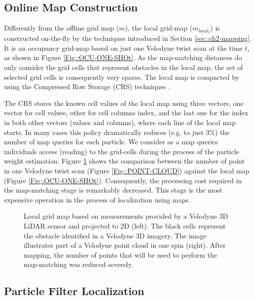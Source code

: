 \subsection {Online Map Construction}
Differently from the offline grid map ($m$), the local grid-map ($m_{local_{t}}$) is constructed on-the-fly by the techniques introduced in Section  \ref{sec::ch2-mapping}. It is an occupancy grid-map based on just one Velodyne twist scan at the time $t$, as shown in Figure \ref{Fig::OCU-ONE-SHOt}. As the map-matching distances do only consider the grid cells that represent obstacles in the local map, the set of selected grid cells is consequently very sparse. The local map is compacted by using the Compressed Row Storage (CRS) techniques \cite{bai2000templates}. 

The CRS stores the known cell values of the local map using three vectors, one vector for cell values, other for cell columns index, and the last one for the index in both other vectors (values and columns), where each line of the local map starts. In many cases this policy dramatically reduces (e.g. to just 3\%) the number of map queries for each particle. We consider as a map queries individuals access (reading) to the grid-cells during the process of the particle weight estimation. Figure \ref{Fig::VELODYNE-ONE-SHOT-MAP} shows the comparison between the number of point in one Velodyne twist scan (Figure \ref{Fig::POINT-CLOUD}) against the local map (Figure \ref{Fig::OCU-ONE-SHOt}). Consequently, the processing cost required in the map-matching stage is remarkably decreased. This stage is the most expensive operation in the process of localization using maps.

\begin{figure}[t]
\centering
\caption{Local grid map based on measurements provided by a Velodyne 3D LiDAR sensor and projected to 2D (left). The black cells represent the obstacle identified in a Velodyne 3D imagery. The image illustrates part of a Velodyne point cloud in one spin (right). After mapping, the number of points that will be used to perform the map-matching was reduced severely.}
\label{Fig::VELODYNE-ONE-SHOT-MAP}
\end{figure}

\subsection{Particle Filter Localization}

